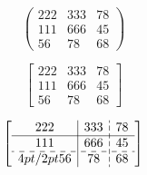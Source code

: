 \documentclass{book}    %
\begin{document}
	$$
	\begin{pmatrix}   %
	222 & 333 & 78 \\ 
	111 & 666 & 45 \\ 
	56 & 78 & 68
	\end{pmatrix}
	$$
	
	$$
	\left[
	\begin{array}{c|cc}
	222 & 333 & 78 \\ 
	\hline
	111 & 666 & 45 \\ 
	56 & 78 & 68
	\end{array} 
	\right]
	$$	
	
	$$
	\left[
	\begin{array}{c|c;{4pt/2pt}c}
	222 & 333 & 78 \\ 
	\hline
	111 & 666 & 45 \\ 
	\hdashline{4pt/2pt}
	56 & 78 & 68
	\end{array} 
	\right]
	$$
	
		
\end{document}
